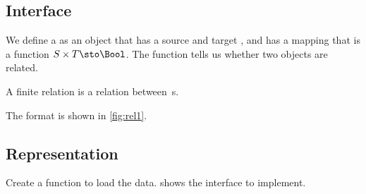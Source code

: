 
\subsection*{Interface}

We define a \Relation as an object that has a source and target \Setoid, and has a mapping that is a function $S \times T \sto \Bool$.
The function tells us whether two objects are related.


A finite relation  is a relation between \FiniteSet\,s.


The format is shown in \cref{fig:rel1}.

\subsection*{Representation}{}

\begin{marginfigure}
    \caption{}
    \label{fig:rel1}
\end{marginfigure}

\begin{codeexercise}
    Create a function to load the data.
     shows the interface to implement.

\end{codeexercise}

